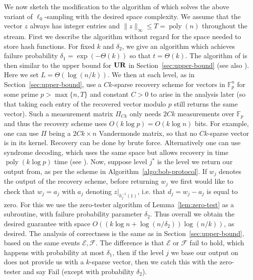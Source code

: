 We now sketch the modification to the algorithm of \cite{JowhariST11} which solves the above variant of $\ell_0$-sampling with the desired space complexity. We assume that the vector $z$ always has integer entries and $\|z\|_\infty \le T = \mathop{poly}(n)$ throughout the stream. First we describe the algorithm without regard for the space needed to store hash functions. For fixed $k$ and $\delta_2$, we give an algorithm which achieves failure probability $\delta_1 = \exp(-\Theta(k))$ so that $t = \Theta(k)$. The algorithm of \cite{JowhariST11} is then similar to the upper bound for $\mathbf{UR}$ in Section~\ref{sec:upper-bound} (see also \cite{CormodeF14}). Here we set $L = \Theta(\log(n/k))$. We then at each level, as in Section~\ref{sec:upper-bound}, use a $Ck$-sparse recovery scheme for vectors in $\mathbb{F}_p^n$ for some prime $p > \max\{n,T\}$ and constant $C>0$ to arise in the analysis later (so that taking each entry of the recovered vector modulo $p$ still returns the same vector). Such a measurement matrix $\Pi_{Ck}$ only needs $2Ck$ measurements over $\mathbb{F}_p$ and thus the recovery scheme uses $O(k\log p) = O(k\log n)$ bits. For example, one can use $\Pi$ being a $2Ck\times n$ Vandermonde matrix, so that no $Ck$-sparse vector is in its kernel. Recovery can be done by brute force. Alternatively one can use syndrome decoding, which uses the same space but allows recovery in time $\mathop{poly}(k\log p)$ time (see \cite[Section E]{DodisORS08}). Now, suppose level $j^*$ is the level we return our output from, as per the scheme in Algorithm~\ref{algo:bob-protocol}. If $w_j$ denotes the output of the recovery scheme, before returning $w_j$ we first would like to check that $w_j = a_j$ with $a_j$ denoting $z|_{h_j^{-1}(1)}$, i.e. that $d_j = w_j - a_j$ is equal to zero. For this we use the zero-tester algorithm of Lemma~\ref{lem:zero-test} as a subroutine, with failure probability parameter $\delta_2$. Thus overall we obtain the desired guarantee with space $O((k\log n + \log(n/\delta_2))\log(n/k))$, as desired. The analysis of correctness is the same as in Section~\ref{sec:upper-bound}, based on the same events $\mathcal E, \mathcal F$. The difference is that $\mathcal E$ or $\mathcal F$ fail to hold, which happens with probability at most $\delta_1$, then if the level $j$ we base our output on does not provide us with a $k$-sparse vector, then we catch this with the zero-tester and say \textsf{Fail} (except with probability $\delta_2$).

